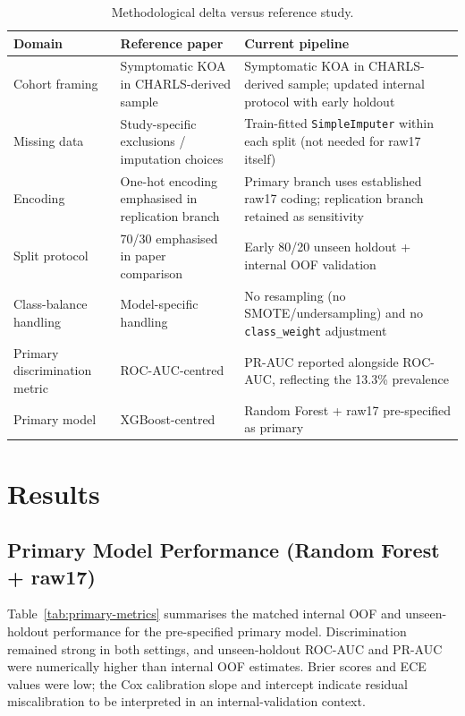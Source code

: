 \documentclass[11pt,a4paper]{article}
\begin{document}
\begin{table}[h!]
\centering
\caption{Methodological delta versus reference study.}
\label{tab:paper-delta}
\begin{tabular}{p{3.4cm}p{5.1cm}p{5.1cm}}
\toprule
Domain & Reference paper & Current pipeline \\
\midrule
Cohort framing & Symptomatic KOA in CHARLS-derived sample & Symptomatic KOA in CHARLS-derived sample; updated internal protocol with early holdout \\
Missing data & Study-specific exclusions / imputation choices & Train-fitted \texttt{SimpleImputer} within each split (not needed for raw17 itself) \\
Encoding & One-hot encoding emphasised in replication branch & Primary branch uses established raw17 coding; replication branch retained as sensitivity \\
Split protocol & 70/30 emphasised in paper comparison & Early 80/20 unseen holdout + internal OOF validation \\
Class-balance handling & Model-specific handling & No resampling (no SMOTE/undersampling) and no \texttt{class\_weight} adjustment \\
Primary discrimination metric & ROC-AUC-centred & PR-AUC reported alongside ROC-AUC, reflecting the 13.3\% prevalence \\
Primary model & XGBoost-centred & Random Forest + raw17 pre-specified as primary \\
\bottomrule
\end{tabular}
\end{table}

\section{Results}

\subsection{Primary Model Performance (Random Forest + raw17)}
Table~\ref{tab:primary-metrics} summarises the matched internal OOF and unseen-holdout performance for the pre-specified primary model. Discrimination remained strong in both settings, and unseen-holdout ROC-AUC and PR-AUC were numerically higher than internal OOF estimates. Brier scores and ECE values were low; the Cox calibration slope and intercept indicate residual miscalibration to be interpreted in an internal-validation context.
\end{document}
